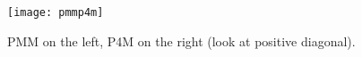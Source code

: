 \begin{figure}[!ht]
\centering
\texttt{[image: pmmp4m]}
\caption{PMM on the left, P4M on the right (look at positive diagonal).}
\label{pmmp4m}
\end{figure}